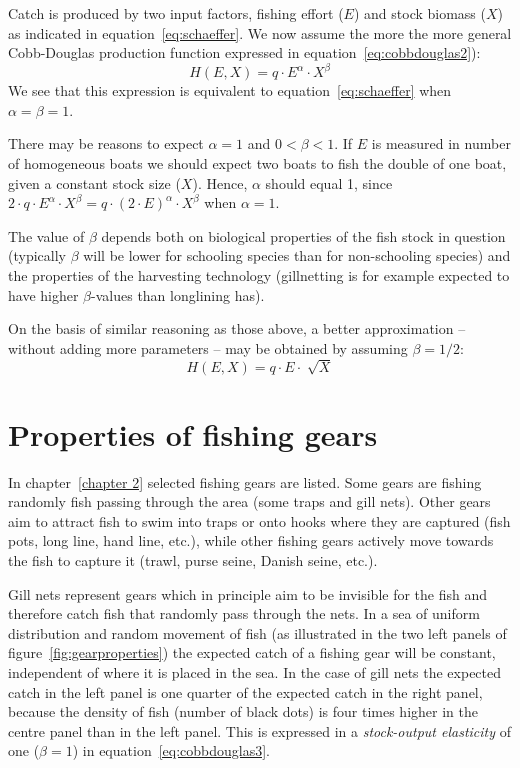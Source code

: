 \documentclass[11pt,fleqn]{book} %
\begin{document}
Catch is produced by two input factors, fishing effort ($E$) and stock biomass ($X$) as indicated in equation~\ref{eq:schaeffer}. We now assume the more the more general Cobb-Douglas production function expressed in equation~\ref{eq:cobbdouglas2}):
\begin{equation} 
\label{eq:cobbdouglas3}
H(E,X) = q \cdot E^{\alpha} \cdot X^{\beta}
\end{equation}
We see that this expression is equivalent to equation~\ref{eq:schaeffer} when $\alpha = \beta = 1$.

There may be reasons to expect $\alpha = 1$ and $0 < \beta < 1$\cite{Hannesson1983,Eide2003a}. If $E$ is measured in number of homogeneous boats we should expect two boats to fish the double of one boat, given a constant stock size ($X$). Hence, $\alpha$ should equal 1, since $2 \cdot q \cdot E^\alpha \cdot X^\beta = q \cdot (2 \cdot E)^\alpha \cdot X^\beta$ when $\alpha = 1$.

The value of $\beta$ depends both on biological properties of the fish stock in question (typically $\beta$ will be lower for schooling species than for non-schooling species) and the properties of the harvesting technology (gillnetting is for example expected to have higher $\beta$-values than longlining has).

On the basis of similar reasoning as those above, a better approximation -- without adding more parameters -- may be obtained by assuming $\beta = 1/2$:
\begin{equation} 
\label{eq:cobbdouglas4}
H(E,X) = q \cdot E \cdot \sqrt[]{X}
\end{equation}

\section{Properties of fishing gears}

In chapter~\ref{chapter 2} selected fishing gears are listed. Some gears are fishing randomly fish passing through the area (some traps and gill nets). Other gears aim to attract fish to swim into traps or onto hooks where they are captured (fish pots, long line, hand line, etc.), while other fishing gears actively move towards the fish to capture it (trawl, purse seine, Danish seine, etc.).

Gill nets represent gears which in principle aim to be invisible for the fish and therefore catch fish that randomly pass through the nets. In a sea of uniform distribution and random movement of fish (as illustrated in the two left panels of figure~\ref{fig:gearproperties}) the expected catch of a fishing gear will be constant, independent of where it is placed in the sea. In the case of gill nets the expected catch in the left panel is one quarter of the expected catch in the right panel, because the density of fish (number of black dots) is four times higher in the centre panel than in the left panel. This is expressed in a \textit{stock-output elasticity} of one ($\beta = 1$) in equation~\ref{eq:cobbdouglas3}. 
\end{document}
